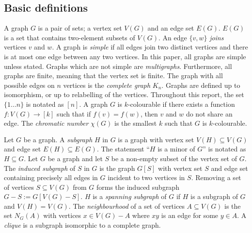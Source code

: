 
\subsection{Basic definitions}\label{sec: Basic definitions}
A graph $G$ is a pair of sets; a vertex set $V(G)$ and an edge set $E(G)$. $E(G)$ is a set that contains two-element subsets of $V(G)$. An edge $ \{v, w\}$ \textit{joins} vertices $v$ and $w$. A graph is \textit{simple} if all edges join two distinct vertices and there is at most one edge between any two vertices. In this paper, all graphs are simple unless stated. Graphs which are not simple are \textit{multigraphs}. Furthermore, all graphs are finite, meaning that the vertex set is finite. The graph with all possible edges on $n$ vertices is the \textit{complete graph} $K_n$. Graphs are defined up to isomorphism, or up to relabelling of the vertices.
Throughout this report, the set $\lbrace 1\ldots n \rbrace$ is notated as $[n]$. 
A graph \(G\) is \(k\)-colourable if there exists a function \(f: V(G) \rightarrow [k]\) such that if $f(v) = f(w)$, then $v$ and $w$ do not share an edge. The \textit{chromatic number} \(\chi(G)\) is the smallest \(k\) such that \(G\) is \(k\)-colourable. 

Let $G$ be a graph. A \textit{subgraph} $H$ in $G$ is a graph with vertex set $V(H) \subseteq V(G)$ and edge set $E(H) \subseteq E(G)$. The statement ``$H$ is a minor of $G$'' is notated as $H \subseteq G$.
Let $G$ be a graph and let $S$ be a non-empty subset of the vertex set of $G$. The \textit{induced subgraph} of $S$ in $G$ is the graph $G[S]$ with vertex set $S$ and edge set containing precisely all edges in $G$ incident to two vertices in $S$. Removing a set of vertices $S \subseteq V(G)$ from $G$ forms the induced subgraph $G - S := G[V(G) - S]$. 
$H$ is a \textit{spanning subgraph} of $G$ if $H$ is a subgraph of $G$ and $V(H) = V(G)$. 
The \textit{neighbourhood} of a set of vertices $A \subseteq V(G)$ is the set $N_G(A)$ with vertices $x \in V(G) - A$ where $xy$ is an edge for some $y \in A$. A \textit{clique} is a subgraph isomorphic to a complete graph. 